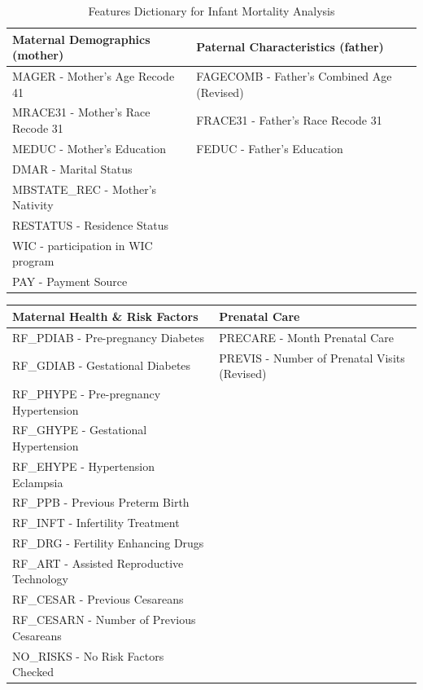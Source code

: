 \documentclass[a4paper,12pt]{article} %
\begin{document}
\begin{table}[H]
\centering
\caption{Features Dictionary for Infant Mortality Analysis}
\label{tab:features_dictionary}
\small
\begin{tabular}{|>{\columncolor{maternal_dem}}l|>{\columncolor{father_char}}l|}
\hline
\textbf{Maternal Demographics (mother)} & \textbf{Paternal Characteristics (father)} \\
\hline
MAGER -  Mother’s Age Recode 41& FAGECOMB -  Father’s Combined Age (Revised)\\
MRACE31 -  Mother’s Race Recode 31& FRACE31 -  Father’s Race Recode 31\\
MEDUC -  Mother’s Education& FEDUC -  Father’s Education\\
DMAR -  Marital Status&  \\
MBSTATE\_REC -  Mother’s Nativity&  \\
RESTATUS -  Residence Status&  \\
WIC -  participation in WIC program&  \\
PAY -  Payment Source&  \\
\hline
\end{tabular}
\end{table}

\begin{table}[H]
\centering
\small
\begin{tabular}{|>{\columncolor{health_risk}}l|>{\columncolor{prenatal_care}}l|}
\hline
\textbf{Maternal Health \& Risk Factors} & \textbf{Prenatal Care} \\
\hline
RF\_PDIAB -  Pre-pregnancy Diabetes& PRECARE -  Month Prenatal Care\\
RF\_GDIAB -  Gestational Diabetes& PREVIS -  Number of Prenatal Visits (Revised)\\
RF\_PHYPE -  Pre-pregnancy Hypertension&  \\
RF\_GHYPE -  Gestational Hypertension&  \\
RF\_EHYPE -  Hypertension Eclampsia&  \\
RF\_PPB -  Previous Preterm Birth&  \\
RF\_INFT -  Infertility Treatment&  \\
RF\_DRG -  Fertility Enhancing Drugs&  \\
RF\_ART -  Assisted Reproductive Technology&  \\
RF\_CESAR -  Previous Cesareans&  \\
RF\_CESARN -  Number of Previous Cesareans&  \\
NO\_RISKS -  No Risk Factors Checked&  \\
\hline
\end{tabular}
\end{table}
\end{document}
